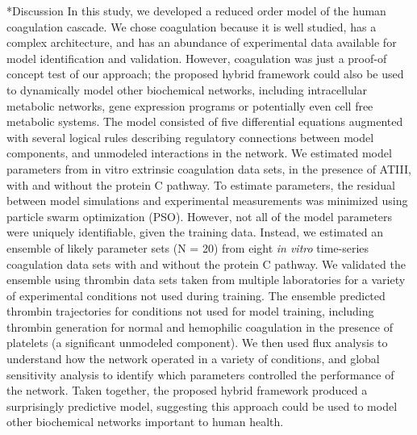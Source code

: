 \documentclass[12pt]{article}
\makeatletter
\renewcommand\section{\@startsection
	{subsection}{2}{0mm}
	{-0.2in}
	{0.05\baselineskip}
	{\normalfont\large\bfseries}}
\makeatother
\begin{document}
\section*{Discussion}
In this study, we developed a reduced order model of the human coagulation cascade.
We chose coagulation because it is well studied, has a complex architecture, 
and has an abundance of experimental data available for model identification and validation. 
However, coagulation was just a proof-of concept test of our approach; 
the proposed hybrid framework could also be used to dynamically model other biochemical networks, including intracellular metabolic networks, gene expression programs 
or potentially even cell free metabolic systems. 
The model consisted of five differential equations augmented with several logical rules describing 
regulatory connections between model components, and unmodeled interactions in the network. 
We estimated model parameters from in vitro extrinsic coagulation data sets, in the presence of ATIII, with and without the protein C pathway. 
To estimate parameters, the residual between model simulations and experimental measurements was minimized using particle swarm optimization (PSO). 
However, not all of the model parameters were uniquely identifiable, given the training data.
Instead, we estimated an ensemble of likely parameter sets (N = 20)
from eight \emph{in vitro} time-series coagulation data sets with and without the protein C pathway.
We validated the ensemble using thrombin data sets taken from multiple laboratories for a variety of experimental conditions not used during training. 
The ensemble predicted thrombin trajectories for conditions not used for model training, including thrombin generation for normal and hemophilic coagulation 
in the presence of platelets (a significant unmodeled component).
We then used flux analysis to understand how the network operated in a variety of conditions, and global sensitivity analysis to identify which parameters controlled the 
performance of the network. Taken together, the proposed hybrid framework produced a surprisingly predictive model, suggesting this approach could 
be used to model other biochemical networks important to human health. 
\end{document}
